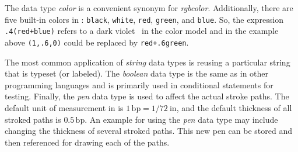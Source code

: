 The data type \textit{color} is a convenient synonym for
\textit{rgbcolor}.  Additionally, there are five built-in \RGB{} colors
in \MP{}: \texttt{black}, \texttt{white}, \texttt{red}, \texttt{green},
and \texttt{blue}.  So, the expression \texttt{.4(red+blue)} refers to a
dark violet~ in the \RGB{} color model and in the
example above \texttt{(1,.6,0)} could be replaced by
\texttt{red+.6green}.

The most common application of \textit{string} data types is reusing a
particular string that is typeset (or labeled).  The \textit{boolean}
data type is the same as in other programming languages and is primarily
used in conditional statements for testing.  Finally, the \textit{pen}
data type is used to affect the actual stroke paths.  The default unit
of measurement in \MP{} is $1\,\mathrm{bp}=1/72\mathrm{\ in}$, and the
default thickness of all stroked paths is $0.5\,\mathrm{bp}$.  An
example for using the \textit{pen} data type may include changing the
thickness of several stroked paths.  This new pen can be stored and then
referenced for drawing each of the paths.
